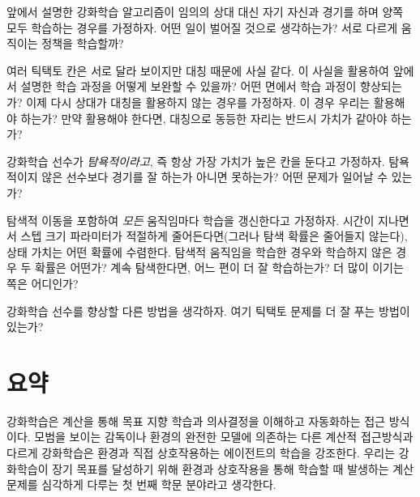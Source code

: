 \begin{exercise}
앞에서 설명한 강화학습 알고리즘이 임의의 상대 대신 자기 자신과 경기를 하며 양쪽
모두 학습하는 경우를 가정하자. 어떤 일이 벌어질 것으로 생각하는가? 서로 다르게
움직이는 정책을 학습할까?
\end{exercise}

\begin{exercise}[대칭]
여러 틱택토 칸은 서로 달라 보이지만 대칭 때문에 사실 같다. 이 사실을 활용하여
앞에서 설명한 학습 과정을 어떻게 보완할 수 있을까? 어떤 면에서 학습 과정이
향상되는가? 이제 다시 상대가 대칭을 활용하지 않는 경우를 가정하자. 이 경우
우리는 활용해야 하는가? 만약 활용해야 한다면, 대칭으로 동등한 자리는 반드시
가치가 같아야 하는가?
\end{exercise}

\begin{exercise}[탐욕적인 경기]
강화학습 선수가 \emph{탐욕적이라고}, 즉 항상 가장 가치가 높은 칸을 둔다고
가정하자. 탐욕적이지 않은 선수보다 경기를 잘 하는가 아니면 못하는가? 어떤 문제가
일어날 수 있는가?
\end{exercise}

\begin{exercise}[탐색을 통한 학습]
탐색적 이동을 포함하여 \emph{모든} 움직임마다 학습을 갱신한다고 가정하자. 시간이
지나면서 스텝 크기 파라미터가 적절하게 줄어든다면(그러나 탐색 확률은 줄어들지
않는다), 상태 가치는 어떤 확률에 수렴한다. 탐색적 움직임을 학습한 경우와
학습하지 않은 경우 두 확률은 어떤가? 계속 탐색한다면, 어느 편이 더 잘
학습하는가? 더 많이 이기는 쪽은 어디인가?
\end{exercise}

\begin{exercise}[다른 개선점]
강화학습 선수를 향상할 다른 방법을 생각하자. 여기 틱택토 문제를 더 잘 푸는
방법이 있는가?
\end{exercise}


\section{요약}

강화학습은 계산을 통해 목표 지향 학습과 의사결정을 이해하고 자동화하는 접근
방식이다. 모범을 보이는 감독이나 환경의 완전한 모델에 의존하는 다른 계산적
접근방식과 다르게 강화학습은 환경과 직접 상호작용하는 에이전트의 학습을
강조한다. 우리는 강화학습이 장기 목표를 달성하기 위해 환경과 상호작용을 통해
학습할 때 발생하는 계산 문제를 심각하게 다루는 첫 번째 학문 분야라고 생각한다.

